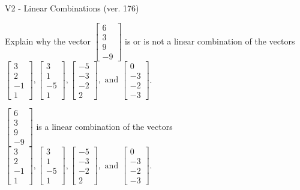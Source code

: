 \begin{exercise}
  \begin{exerciseTitle}V2 - Linear Combinations (ver. 176)\end{exerciseTitle}
  \begin{exerciseStatement}
    Explain why the vector \(\left[\begin{array}{c}
6 \\
3 \\
9 \\
-9
\end{array}\right]\)  is or is not a linear 
	combination of the vectors \(\left[\begin{array}{c}
3 \\
2 \\
-1 \\
1
\end{array}\right] , \left[\begin{array}{c}
3 \\
1 \\
-5 \\
1
\end{array}\right] , \left[\begin{array}{c}
-5 \\
-3 \\
-2 \\
2
\end{array}\right] , \text{ and } \left[\begin{array}{c}
0 \\
-3 \\
-2 \\
-3
\end{array}\right]\).
	


  \end{exerciseStatement}
  \begin{exerciseAnswer}
   \(\left[\begin{array}{c}
6 \\
3 \\
9 \\
-9
\end{array}\right]\) 
  	 is  
	a linear combination of the vectors \(\left[\begin{array}{c}
3 \\
2 \\
-1 \\
1
\end{array}\right] , \left[\begin{array}{c}
3 \\
1 \\
-5 \\
1
\end{array}\right] , \left[\begin{array}{c}
-5 \\
-3 \\
-2 \\
2
\end{array}\right] , \text{ and } \left[\begin{array}{c}
0 \\
-3 \\
-2 \\
-3
\end{array}\right]\).


\end{exerciseAnswer}
\end{exercise}
